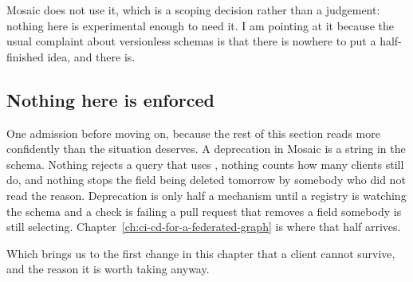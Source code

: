 Mosaic does not use it, which is a scoping decision rather than a judgement:
nothing here is experimental enough to need it. I am pointing at it because the
usual complaint about versionless schemas is that there is nowhere to put a
half-finished idea, and there is.

\subsection*{Nothing here is enforced}

%
One admission before moving on, because the rest of this section reads more
confidently than the situation deserves. A deprecation in Mosaic is a string in
the schema. Nothing rejects a query that uses , nothing counts
how many clients still do, and nothing stops the field being deleted tomorrow
by somebody who did not read the reason. Deprecation is only half a mechanism
until a registry is watching the schema and a check is failing a pull request
that removes a field somebody is still selecting.
Chapter~\ref{ch:ci-cd-for-a-federated-graph} is where that half arrives.

Which brings us to the first change in this chapter that a client cannot
survive, and the reason it is worth taking anyway.
